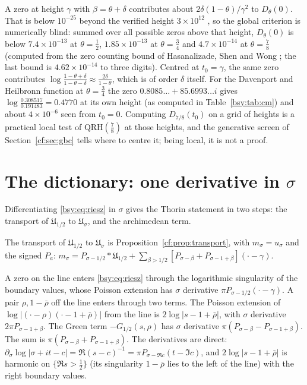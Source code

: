 \begin{remark}\label{bsy:rem:local}
A zero at height $\gamma$ with $\beta=\theta+\delta$ contributes about $2\delta(1-\theta)/\gamma^2$ to $D_\theta(0)$. That is below $10^{-25}$ beyond the verified height $3\times10^{12}$ \cite{PT21}, so the global criterion is numerically blind: summed over all possible zeros above that height, $D_\theta(0)$ is below $7.4\times10^{-13}$ at $\theta=\frac12$, $1.85\times10^{-13}$ at $\theta=\frac34$ and $4.7\times10^{-14}$ at $\theta=\frac78$ (computed from the zero counting bound of Hasanalizade, Shen and Wong \cite{HSW22}; the last bound is $4.62\times10^{-14}$ to three digits). Centred at $t_0=\gamma$, the same zero contributes $\log\frac{1-\theta+\delta}{1-\theta-\delta}\approx\frac{2\delta}{1-\theta}$, which is of order $\delta$ itself. For the Davenport and Heilbronn function at $\theta=\frac34$ the zero $0.8085\ldots+85.6993\ldots i$ gives $\log\frac{0.308517}{0.191483}=0.4770$ at its own height (as computed in Table~\ref{bsy:tab:cm}) and about $4\times10^{-6}$ seen from $t_0=0$. Computing $D_{7/8}(t_0)$ on a grid of heights is a practical local test of $\mathrm{QRH}(\frac78)$ at those heights, and the generative screen of Section~\ref{cf:sec:gbc} tells where to centre it; being local, it is not a proof.
\end{remark}

\section{The dictionary: one derivative in \texorpdfstring{$\sigma$}{sigma}}\label{bsy:sec:dictionary}

Differentiating \eqref{bsy:eq:riesz} in $\sigma$ gives the Thorin statement in two steps: the transport of $\mathfrak U_{1/2}$ to $\mathfrak U_\sigma$, and the archimedean term.

The transport of $\mathfrak U_{1/2}$ to $\mathfrak U_\sigma$ is Proposition~\ref{cf:prop:transport}, with $m_\sigma=u_\sigma$ and the signed $P_a$: $m_\sigma=P_{\sigma-1/2}*\mathfrak U_{1/2}+\sum_{\beta>1/2}[P_{\sigma-\beta}+P_{\sigma-1+\beta}](\cdot-\gamma)$.

\begin{remark}
A zero on the line enters \eqref{bsy:eq:riesz} through the logarithmic singularity of the boundary values, whose Poisson extension has $\sigma$ derivative $\pi P_{\sigma-1/2}(\cdot-\gamma)$. A pair $\rho,1-\bar\rho$ off the line enters through two terms. The Poisson extension of $\log|(\cdot-\rho)(\cdot-1+\bar\rho)|$ from the line is $2\log|s-1+\bar\rho|$, with $\sigma$ derivative $2\pi P_{\sigma-1+\beta}$. The Green term $-G_{1/2}(s,\rho)$ has $\sigma$ derivative $\pi(P_{\sigma-\beta}-P_{\sigma-1+\beta})$. The sum is $\pi(P_{\sigma-\beta}+P_{\sigma-1+\beta})$. The derivatives are direct: $\partial_\sigma\log|\sigma+it-c|=\Re(s-c)^{-1}=\pi P_{\sigma-\Re c}(t-\Im c)$, and $2\log|s-1+\bar\rho|$ is harmonic on $\{\Re s>\frac12\}$ (its singularity $1-\bar\rho$ lies to the left of the line) with the right boundary values.
\end{remark}

